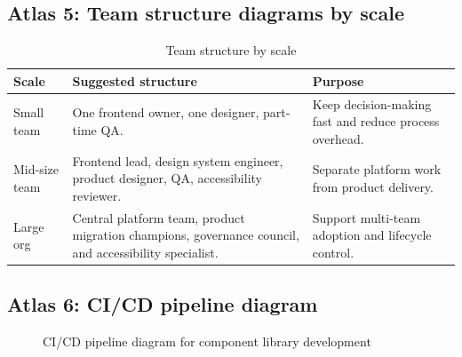 \subsection*{Atlas 5: Team structure diagrams by scale}
\begin{table}[htbp]
  \centering
  \caption{Team structure by scale}
  \begin{tabularx}{\textwidth}{@{}p{}p{}Y@{}}
    \toprule
    \textbf{Scale} & \textbf{Suggested structure} & \textbf{Purpose} \\
    \midrule
    Small team & One frontend owner, one designer, part-time QA. & Keep decision-making fast and reduce process overhead. \\
    Mid-size team & Frontend lead, design system engineer, product designer, QA, accessibility reviewer. & Separate platform work from product delivery. \\
    Large org & Central platform team, product migration champions, governance council, and accessibility specialist. & Support multi-team adoption and lifecycle control. \\
    \bottomrule
  \end{tabularx}
\end{table}

\subsection*{Atlas 6: CI/CD pipeline diagram}
\begin{figure}[p]
\centering
{}
\caption{CI/CD pipeline diagram for component library development}
\end{figure}


